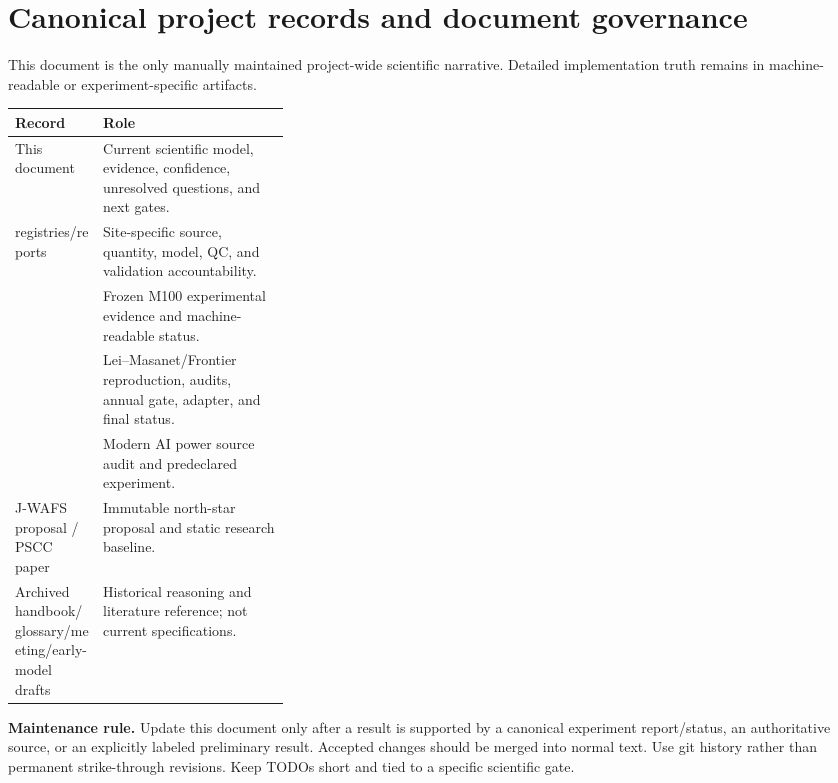 \documentclass[11pt]{article}
\begin{document}
\section{Canonical project records and document governance}

This document is the only manually maintained project-wide scientific narrative. Detailed implementation truth remains in machine-readable or experiment-specific artifacts.

\begin{center}
\scriptsize
\begin{tabularx}{0.97\linewidth}{@{}p{0.32\linewidth}Y@{}}
\toprule
\textbf{Record} & \textbf{Role} \\
\midrule
This document & Current scientific model, evidence, confidence, unresolved questions, and next gates. \\
 registries/reports & Site-specific source, quantity, model, QC, and validation accountability. \\
\newline{} & Frozen M100 experimental evidence and machine-readable status. \\
 & Lei--Masanet/Frontier reproduction, audits, annual gate, adapter, and final status. \\
 & Modern AI power source audit and predeclared experiment. \\
J-WAFS proposal / PSCC paper & Immutable north-star proposal and static research baseline. \\
Archived handbook/glossary/meeting/early-model drafts & Historical reasoning and literature reference; not current specifications. \\
\bottomrule
\end{tabularx}
\end{center}

\textbf{Maintenance rule.} Update this document only after a result is supported by a canonical experiment report/status, an authoritative source, or an explicitly labeled preliminary result. Accepted changes should be merged into normal text. Use git history rather than permanent strike-through revisions. Keep TODOs short and tied to a specific scientific gate.

\end{document}
